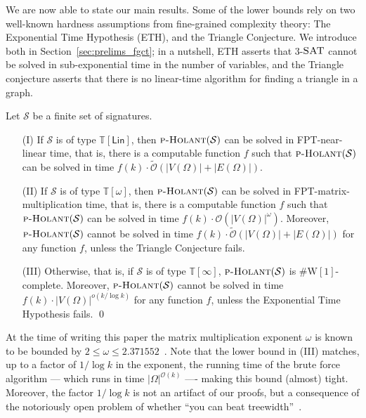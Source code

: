 \documentclass[authorcolumns,numberwithinsect]{no-lipics-v2022}
\newcommand{\W}{\mathrm{W}}
\begin{document}
We are now able to state our main results. Some of the lower bounds rely on two well-known hardness assumptions from fine-grained complexity theory: The Exponential Time Hypothesis (ETH), and the Triangle Conjecture. We introduce both in Section~\ref{sec:prelims_fgct}; in a nutshell, ETH asserts that $3$-$\textsc{SAT}$ cannot be solved in sub-exponential time in the number of variables, and the Triangle conjecture asserts that there is no linear-time algorithm for finding a triangle in a graph.  
\begin{mtheorem}\label{main_thm}
    Let $\mathcal{S}$ be a finite set of signatures.
    \begin{itemize}
        \item[(I)] If $\mathcal{S}$ is of type $\mathbb{T}[\mathsf{Lin}]$, then $\textsc{p-Holant}(\mathcal{S})$ can be solved in FPT-near-linear time, that is, there is a computable function $f$ such that $\textsc{p-Holant}(\mathcal{S})$ can be solved in time $f(k)\cdot \tilde{\mathcal{O}}(|V(\Omega)|+|E(\Omega)|)$.
        \item[(II)] If $\mathcal{S}$ is of type $\mathbb{T}[\omega]$, then $\textsc{p-Holant}(\mathcal{S})$ can be solved in FPT-matrix-multiplication time, that is, there is a computable function $f$ such that $\textsc{p-Holant}(\mathcal{S})$ can be solved in time $f(k)\cdot \mathcal{O}(|V(\Omega)|^{\omega})$. Moreover, $\textsc{p-Holant}(\mathcal{S})$ cannot be solved in time $f(k)\cdot \tilde{\mathcal{O}}(|V(\Omega)|+|E(\Omega)|)$ for any function $f$, unless the Triangle Conjecture fails.
        \item[(III)] Otherwise, that is, if $\mathcal{S}$ is of type $\mathbb{T}[\infty]$, $\textsc{p-Holant}(\mathcal{S})$ is $\#\W[1]$-complete. Moreover, $\textsc{p-Holant}(\mathcal{S})$ cannot be solved in time $f(k)\cdot |V(\Omega)|^{o(k/\log k)}$ for any function $f$, unless the Exponential Time Hypothesis fails.  \qed
    \end{itemize}
\end{mtheorem}
At the time of writing this paper the matrix multiplication exponent $\omega$ is known to be bounded by $2\leq \omega\leq 2.371552$~\cite{WilliamsXXZ24}.
Note that the lower bound in (III) matches, up to a factor of $1/\log k$ in the exponent, the running time of the brute force algorithm --- which runs in time $|\Omega|^{\mathcal{O}(k)}$ ---- making this bound (almost) tight. Moreover, the factor $1/\log k$ is not an artifact of our proofs, but a consequence of the notoriously open problem of whether ``you can beat treewidth''~\cite{Marx10}.
\end{document}
